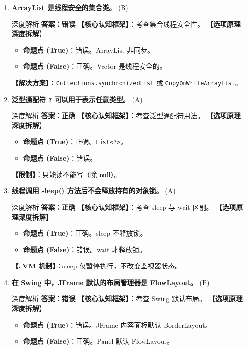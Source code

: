 ﻿\documentclass[12pt, a4paper]{ctexart}
\newcommand{\code}[1]{\texttt{#1}}
\newcommand{\tfblank}{\underline{\hspace{1.5em}}}
\begin{document}
\begin{enumerate}[label=\textbf{\arabic*.}, itemsep=1em]
	\item \textbf{ArrayList 是线程安全的集合类。} \tfblank (B)
	      \begin{bluebox}{深度解析}
		      \textbf{答案：错误}
		      \textbf{【核心认知框架】}：考查集合线程安全性。
		      \textbf{【选项原理深度拆解】}
		      \begin{itemize}[leftmargin=*, nosep]
			      \item \textbf{命题点 (True)}：错误。ArrayList 非同步。
			      \item \textbf{命题点 (False)}：正确。Vector 是线程安全的。
		      \end{itemize}
		      \textbf{【解决方案】}：\code{Collections.synchronizedList} 或 \code{CopyOnWriteArrayList}。
	      \end{bluebox}

	\item \textbf{泛型通配符 \code{?} 可以用于表示任意类型。} \tfblank (A)
	      \begin{bluebox}{深度解析}
		      \textbf{答案：正确}
		      \textbf{【核心认知框架】}：考查泛型通配符用法。
		      \textbf{【选项原理深度拆解】}
		      \begin{itemize}[leftmargin=*, nosep]
			      \item \textbf{命题点 (True)}：正确。\code{List<?>}。
			      \item \textbf{命题点 (False)}：错误。
		      \end{itemize}
		      \textbf{【限制】}：只能读不能写（除 null）。
	      \end{bluebox}

	\item \textbf{线程调用 sleep() 方法后不会释放持有的对象锁。} \tfblank (A)
	      \begin{bluebox}{深度解析}
		      \textbf{答案：正确}
		      \textbf{【核心认知框架】}：考查 sleep 与 wait 区别。
		      \textbf{【选项原理深度拆解】}
		      \begin{itemize}[leftmargin=*, nosep]
			      \item \textbf{命题点 (True)}：正确。sleep 不释放锁。
			      \item \textbf{命题点 (False)}：错误。wait 才释放锁。
		      \end{itemize}
		      \textbf{【JVM 机制】}：sleep 仅暂停执行，不改变监视器状态。
	      \end{bluebox}

	\item \textbf{在 Swing 中，JFrame 默认的布局管理器是 FlowLayout。} \tfblank (B)
	      \begin{bluebox}{深度解析}
		      \textbf{答案：错误}
		      \textbf{【核心认知框架】}：考查 Swing 默认布局。
		      \textbf{【选项原理深度拆解】}
		      \begin{itemize}[leftmargin=*, nosep]
			      \item \textbf{命题点 (True)}：错误。JFrame 内容面板默认 BorderLayout。
			      \item \textbf{命题点 (False)}：正确。Panel 默认 FlowLayout。
		      \end{itemize}
	      \end{bluebox}
\end{enumerate}
\end{document}
